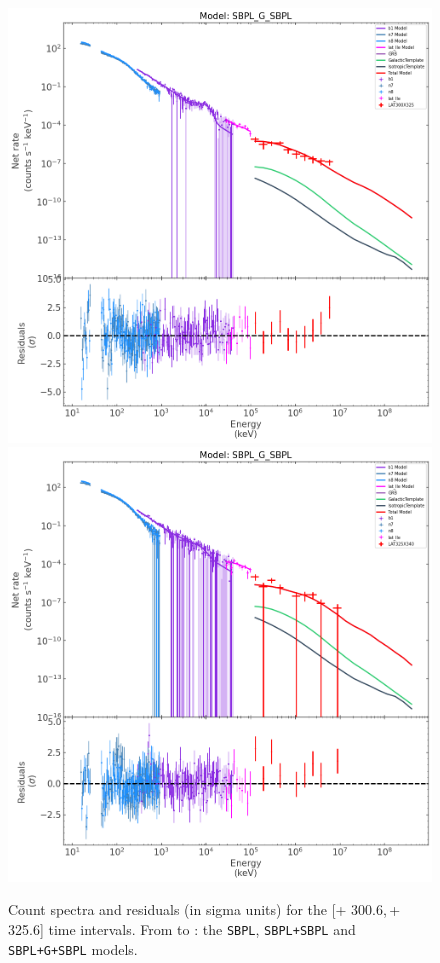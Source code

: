 \documentclass[preprint]{aastex631}
\begin{document}
\begin{figure}[t]
    \includegraphics[width=0.4\linewidth]{best_spectrum_300p61-325p61_SBPL_G_SBPL.png}
    \includegraphics[width=0.4\linewidth]{best_spectrum_325p61-340p61_SBPL_G_SBPL.png}
\caption{Count spectra  and residuals (in sigma units) for the [\trig+ 300.6,\,\trig+ 325.6]   time intervals. From  to : the \texttt{SBPL}, \texttt{SBPL+SBPL} and \texttt{SBPL+G+SBPL} models.}
    \label{fig:interval34}
\end{figure}
\end{document}
